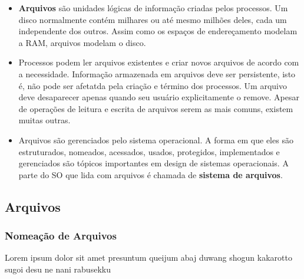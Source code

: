 \documentclass[10pt]{article}
\begin{document}
\begin{itemize}
    \item \textbf{Arquivos} são unidades lógicas de informação criadas pelos processos.
    Um disco normalmente contém milhares ou até mesmo milhões deles, cada um 
    independente dos outros. Assim como os espaços de endereçamento modelam a RAM,
    arquivos modelam o disco.
    \item Processos podem ler arquivos existentes e criar novos arquivos de acordo com 
    a necessidade. Informação armazenada em arquivos deve ser persistente, isto é, não
    pode ser afetatda pela criação e término dos processos. Um arquivo deve desaparecer
    apenas quando seu usuário explicitamente o remove. Apesar de operações de leitura
    e escrita de arquivos serem as mais comuns, existem muitas outras.
    \item Arquivos são gerenciados pelo sistema operacional. A forma em que eles são
    estruturados, nomeados, acessados, usados, protegidos, implementados e gerenciados
    são tópicos importantes em design de sistemas operacionais. A parte do SO que lida
    com arquivos é chamada de \textbf{sistema de arquivos}.
\end{itemize}
\subsection{Arquivos}
\subsubsection{Nomeação de Arquivos}
\par Lorem ipsum dolor sit amet presuntum queijum abaj duwang shogun kakarotto
sugoi desu ne nani rabusekku
\end{document}
